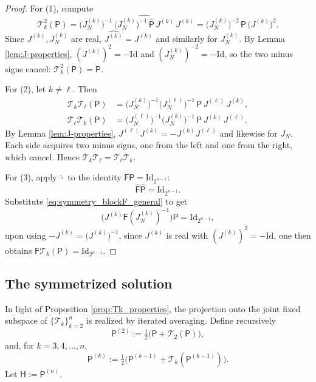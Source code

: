 \documentclass[11pt]{amsart}
\begin{document}
\begin{proof}
For (1), compute
\[
\mathcal T_k^2(\mathsf{P}) = \bigl(J_N^{(k)}\bigr)^{-1}\,\widehat{\bigl(J_N^{(k)}\bigr)^{-1}\,\widehat{\mathsf{P}}\, J^{(k)}}\,J^{(k)} = \bigl(J_N^{(k)}\bigr)^{-2}\, \mathsf{P}\,\bigl(J^{(k)}\bigr)^2.
\]
Since $J^{(k)}, J_N^{(k)}$ are real, $\widehat{J^{(k)}} = J^{(k)}$ and similarly for $J_N^{(k)}$. By Lemma \ref{lem:J-properties}, $(J^{(k)})^2 = -\mathrm{Id}$ and $(J_N^{(k)})^{-2} = -\mathrm{Id}$, so the two minus signs cancel: $\mathcal T_k^2(\mathsf{P}) = \mathsf{P}$.

For (2), let $k \ne \ell$. Then
\begin{align*}
\mathcal T_k \mathcal T_\ell(\mathsf{P}) &= \bigl(J_N^{(k)}\bigr)^{-1}\bigl(J_N^{(\ell)}\bigr)^{-1}\, \mathsf{P}\, J^{(\ell)}\, J^{(k)},\\
\mathcal T_\ell \mathcal T_k(\mathsf{P}) &= \bigl(J_N^{(\ell)}\bigr)^{-1}\bigl(J_N^{(k)}\bigr)^{-1}\, \mathsf{P}\, J^{(k)}\, J^{(\ell)}.
\end{align*}
By Lemma \ref{lem:J-properties}, $J^{(\ell)} J^{(k)} = -J^{(k)} J^{(\ell)}$ and likewise for $J_N$. Each side acquires two minus signs, one from the left and one from the right, which cancel. Hence $\mathcal T_k \mathcal T_\ell = \mathcal T_\ell \mathcal T_k$.

For (3), apply $\widehat\cdot$ to the identity $\mathsf{F} \mathsf{P} = \mathrm{Id}_{2^{n-1}}$:
\[
\widehat{\mathsf{F}} \widehat{\mathsf{P}} = \mathrm{Id}_{2^{n-1}}.
\]
Substitute \eqref{eq:symmetry_blockF_general} to get
\[
\bigl(J^{(k)} \mathsf{F} (J_N^{(k)})^{-1}\bigr) \widehat{\mathsf{P}} = \mathrm{Id}_{2^{n-1}}, \]
upon using $-J^{(k)} = \bigl(J^{(k)}\bigr)^{-1}$, since $J^{(k)}$ is real with $(J^{(k)})^2 = -\mathrm{Id}$, %
one then obtains $\mathsf{F}\mathcal T_k(\mathsf{P}) = \mathrm{Id}_{2^{n-1}}$.
\end{proof}

\subsection{The symmetrized solution}

In light of Proposition \ref{prop:Tk_properties}, the projection onto the joint fixed subspace of $\{\mathcal T_k\}_{k=2}^n$ is realized by iterated averaging. Define recursively
\[
\mathsf{P}^{(2)} := \tfrac12\bigl(\mathsf{P} + \mathcal T_2(\mathsf{P})\bigr),
\]
and, for $k = 3, 4, \ldots, n$,
\[
\mathsf{P}^{(k)} := \tfrac12\bigl(\mathsf{P}^{(k-1)} + \mathcal T_k(\mathsf{P}^{(k-1)})\bigr).
\]
Let $\mathsf{H} := \mathsf{P}^{(n)}$.
\end{document}
